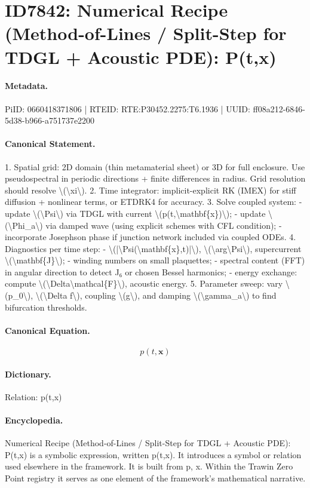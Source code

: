 \section*{ID7842: Numerical Recipe (Method-of-Lines / Split-Step for TDGL + Acoustic PDE): P(t,x)}
\paragraph{Metadata.}
PiID: 0660418371806 | RTEID: RTE:P30452.2275:T6.1936 | UUID: ff08a212-6846-5d38-b966-a751737e2200

\paragraph{Canonical Statement.}
1. Spatial grid: 2D domain (thin metamaterial sheet) or 3D for full enclosure. Use pseudospectral in periodic directions + finite differences in radius. Grid resolution should resolve \textbackslash{}(\textbackslash{}xi\textbackslash{}). 2. Time integrator: implicit-explicit RK (IMEX) for stiff diffusion + nonlinear terms, or ETDRK4 for accuracy. 3. Solve coupled system: - update \textbackslash{}(\textbackslash{}Psi\textbackslash{}) via TDGL with current \textbackslash{}(p(t,\textbackslash{}mathbf\{x\})\textbackslash{}); - update \textbackslash{}(\textbackslash{}Phi\_a\textbackslash{}) via damped wave (using explicit schemes with CFL condition); - incorporate Josephson phase if junction network included via coupled ODEs. 4. Diagnostics per time step: - \textbackslash{}(|\textbackslash{}Psi(\textbackslash{}mathbf\{x\},t)|\textbackslash{}), \textbackslash{}(\textbackslash{}arg\textbackslash{}Psi\textbackslash{}), supercurrent \textbackslash{}(\textbackslash{}mathbf\{J\}\textbackslash{}); - winding numbers on small plaquettes; - spectral content (FFT) in angular direction to detect J₆ or chosen Bessel harmonics; - energy exchange: compute \textbackslash{}(\textbackslash{}Delta\textbackslash{}mathcal\{F\}\textbackslash{}), acoustic energy. 5. Parameter sweep: vary \textbackslash{}(p\_0\textbackslash{}), \textbackslash{}(\textbackslash{}Delta f\textbackslash{}), coupling \textbackslash{}(g\textbackslash{}), and damping \textbackslash{}(\textbackslash{}gamma\_a\textbackslash{}) to find bifurcation thresholds.

\paragraph{Canonical Equation.}
\[
p(t,\mathbf{x})
\]

\paragraph{Dictionary.}
Relation: p(t,x)

\paragraph{Encyclopedia.}
Numerical Recipe (Method-of-Lines / Split-Step for TDGL + Acoustic PDE): P(t,x) is a symbolic expression, written p(t,x). It introduces a symbol or relation used elsewhere in the framework. It is built from p, x. Within the Trawin Zero Point registry it serves as one element of the framework's mathematical narrative.
